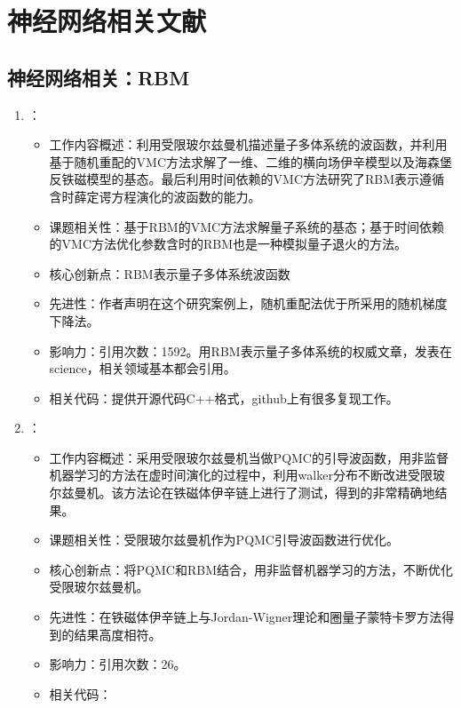 \chapter{神经网络相关文献}
\section{神经网络相关：RBM}
    \begin{enumerate}
        \item \citet{carleo2017solving}：
            \begin{itemize}
                \item 工作内容概述：利用受限玻尔兹曼机描述量子多体系统的波函数，并利用基于随机重配\citep{sorella2007weak}的VMC方法求解了一维、二维的横向场伊辛模型以及海森堡反铁磁模型的基态。最后利用时间依赖的VMC方法\citep{carleo2012localization, carleo2014light}研究了RBM表示遵循含时薛定谔方程演化的波函数的能力。
                \item 课题相关性：基于RBM的VMC方法求解量子系统的基态；基于时间依赖的VMC方法优化参数含时的RBM也是一种模拟量子退火的方法。
                \item 核心创新点：RBM表示量子多体系统波函数
                \item 先进性：作者声明在这个研究案例上，随机重配法优于\citet{harju1997stochastic}所采用的随机梯度下降法。
                \item 影响力：引用次数：1592。用RBM表示量子多体系统的权威文章，发表在science，相关领域基本都会引用。
                \item 相关代码：提供开源代码C++格式，github上有很多复现工作。
            \end{itemize}
            \item \citet{pilati2019self}：
            \begin{itemize}
                \item 工作内容概述：采用受限玻尔兹曼机当做PQMC的引导波函数，用非监督机器学习的方法在虚时间演化的过程中，利用walker分布不断改进受限玻尔兹曼机。该方法论在铁磁体伊辛链上进行了测试，得到的非常精确地结果。
                \item 课题相关性：受限玻尔兹曼机作为PQMC引导波函数进行优化。
                \item 核心创新点：将PQMC和RBM结合，用非监督机器学习的方法，不断优化受限玻尔兹曼机。
                \item 先进性：在铁磁体伊辛链上与Jordan-Wigner理论和圈量子蒙特卡罗方法得到的结果高度相符。
                \item 影响力：引用次数：26。
                \item 相关代码：
            \end{itemize}
        \end{enumerate}

